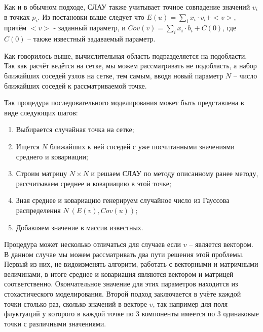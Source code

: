 Как и в обычном подходе, СЛАУ также учитывает точное совпадение значений $v_i$ в точках $p_i$. Из постановки выше следует что $E(u) = \sum_{i} x_i \cdot v_i + <v>$, причём $<v>$ - заданный параметр, и $Cov(v) = \sum_{i} x_i \cdot b_i + C(0)$, где $C(0)$ -- также известный задаваемый параметр.

Как говорилось выше, вычислительная область подразделяется на подобласти. Так как расчёт ведётся на сетке, мы можем рассматривать не подобласть, а набор ближайших соседей узлов на сетке, тем самым, вводя новый параметр $N$ -- число ближайших соседей к рассматриваемой точке.

Так процедура последовательного моделирования может быть представлена в виде следующих шагов: 

\begin{enumerate}
    \item Выбирается случайная точка на сетке;
    \item Ищется $N$ ближайших к ней соседей с уже посчитанными значениями среднего и ковариации;
    \item Строим матрицу $N \times N$ и решаем СЛАУ по методу описанному ранее методу, рассчитываем среднее и ковариацию в этой точке;
    \item Зная среднее и ковариацию генерируем случайное число из Гауссова распределения $N~(E(v), Cov(u))$;
    \item Добавляем значение в массив известных.
\end{enumerate}

Процедура может несколько отличаться для случаев если $v$ -- является вектором. В данном случае мы можем рассматривать два пути решения этой проблемы. Первый из них, не видоизменять алгоритм, работать с векторными и матричными величинами, в итоге среднее и ковариация являются вектором и матрицей соответственно. Окончательное значение для этих параметров находится из стохастического моделирования. Второй подход заключается в учёте каждой точки столько раз, сколько значений в векторе $v$, так например для поля флуктуаций у которого в каждой точке по 3 компоненты имеется по 3 одинаковые точки с различными значениями.